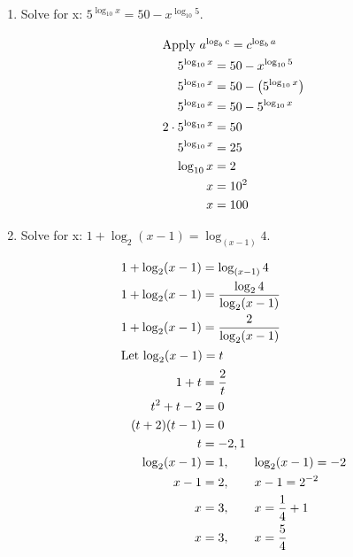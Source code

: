 \begin{enumerate}
        \BgThispage
    \item Solve for x: $5^{\log_{10}x}=50-x^{\log_{10}5}$.
        \begin{solution}
            \begin{align*}
                \intertext{Apply $a^{\log_b c} = c^{\log_b a}$}
                5^{\log_{10}x} &= 50-x^{\log_{10}5}\\
                5^{\log_{10}x} &= 50-\left(5^{\log_{10}x}\right)\\
                5^{\log_{10}x} &= 50-5^{\log_{10}x}\\
                2\cdot 5^{\log_{10}x} &= 50\\
                5^{\log_{10}x} &= 25\\
                \log_{10}x &= 2\\
                x &= 10^2\\
                x &= 100
            \end{align*}
        \end{solution}

    \item Solve for x: $1+\log_2(x-1)=\log_{(x-1)}4$.
        \begin{solution}
            \begin{align*}
                1 + \log_2(x-1) &= \log_{(x-1)}4\\
                1 + \log_2(x-1) &= \frac{\log_2 4}{\log_2 (x-1)}\\
                1 + \log_2(x-1) &= \frac{2}{\log_2 (x-1)}\\
                \intertext{Let \( \log_2 (x-1) = t \)}
                1 + t &= \frac{2}{t}\\
                t^2 + t - 2 &= 0\\
                (t+2)(t-1) &= 0\\
                t &= -2, 1\\
                \log_2 (x-1) &= 1, \qquad \log_2 (x-1) = -2\\
                x-1 &= 2, \qquad x-1 = 2^{-2}\\
                x &= 3, \qquad x = \frac{1}{4} + 1\\
                x &= 3, \qquad x = \frac{5}{4}
            \end{align*}
        \end{solution}
        \BgThispage

\end{enumerate}